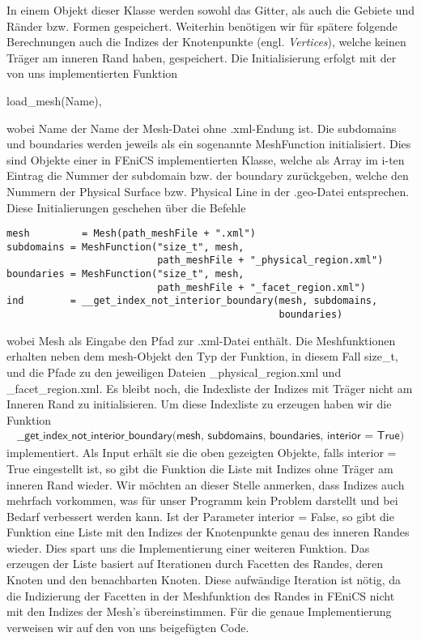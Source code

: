 In einem Objekt dieser Klasse werden sowohl das Gitter, als auch die Gebiete und Ränder bzw. Formen gespeichert. Weiterhin benötigen wir für spätere folgende Berechnungen auch die Indizes der Knotenpunkte (engl. \textit{Vertices}), welche keinen Träger am inneren Rand haben, gespeichert. Die Initialisierung erfolgt mit der von uns implementierten Funktion 
\begin{center}
\textsf{load\_mesh(Name)},
\end{center} wobei \textsf{Name} der Name der Mesh-Datei ohne \textsf{.xml}-Endung ist. Die \textsf{subdomains} und \textsf{boundaries} werden jeweils als ein sogenannte \textsf{MeshFunction} initialisiert. Dies sind Objekte einer in FEniCS implementierten Klasse, welche als Array im \textsf{i}-ten Eintrag die Nummer der \textsf{subdomain} bzw. der \textsf{boundary} zurückgeben, welche den Nummern der \textsf{Physical Surface} bzw. \textsf
{Physical Line}  in der \textsf{.geo}-Datei entsprechen. Diese Initialierungen geschehen über die Befehle

\begin{lstlisting}
mesh 	     = Mesh(path_meshFile + ".xml")
subdomains = MeshFunction("size_t", mesh,
                          path_meshFile + "_physical_region.xml")
boundaries = MeshFunction("size_t", mesh, 
                          path_meshFile + "_facet_region.xml")
ind        = __get_index_not_interior_boundary(mesh, subdomains, 
                                               boundaries)  
\end{lstlisting}
wobei \textsf{Mesh} als Eingabe den Pfad zur \textsf{.xml}-Datei enthält. Die Meshfunktionen erhalten neben dem \textsf{mesh}-Objekt den Typ der Funktion, in diesem Fall \textsf{size\_t}, und die Pfade zu den jeweiligen Dateien \textsf{\_physical\_region.xml} und \textsf{\_facet\_region.xml}. Es bleibt noch, die Indexliste der Indizes mit Träger nicht am Inneren Rand zu initialisieren. Um diese Indexliste zu erzeugen haben wir die Funktion 
\begin{align*}
\textsf{\_\_get\_index\_not\_interior\_boundary(mesh, subdomains, 
boundaries, interior = True)}  
\end{align*}
implementiert. Als Input erhält sie die oben gezeigten Objekte, falls \textsf{interior = True} eingestellt ist, so gibt die Funktion die Liste mit Indizes ohne Träger am inneren Rand wieder. Wir möchten an dieser Stelle anmerken, dass Indizes auch mehrfach vorkommen, was für unser Programm kein Problem darstellt und bei Bedarf verbessert werden kann. Ist der Parameter \textsf{interior = False}, so gibt die Funktion eine Liste mit den Indizes der Knotenpunkte genau des inneren Randes wieder. Dies spart uns die Implementierung einer weiteren Funktion. Das erzeugen der Liste basiert auf Iterationen durch Facetten des Randes, deren Knoten und den benachbarten Knoten. Diese aufwändige Iteration ist nötig, da die Indizierung der Facetten in der Meshfunktion des Randes in FEniCS nicht mit den Indizes der Mesh's übereinstimmen. Für die genaue Implementierung verweisen wir auf den von uns beigefügten Code. 


